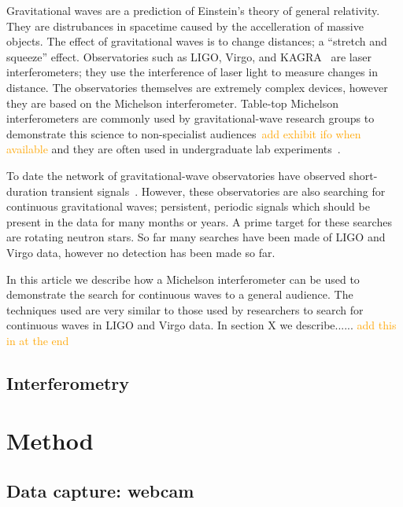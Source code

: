 \documentclass[prb,preprint]{revtex4-1}
\newcommand{\han}{\textcolor{orange}}
\begin{document}
Gravitational waves are a prediction of Einstein's theory of general relativity. 
They are distrubances in spacetime caused by the accelleration of massive objects. 
The effect of gravitational waves is to change distances; a ``stretch and squeeze'' effect. 
Observatories such as LIGO, Virgo, and KAGRA~\cite{KAGRA:2013} are laser interferometers; they use the interference of laser light to measure changes in distance. 
The observatories themselves are extremely complex devices, however they are based on the Michelson interferometer. 
Table-top Michelson interferometers are commonly used by gravitational-wave research groups to demonstrate this science to non-specialist audiences~\cite{ThorLabsIFO,NikhefIFO}\han{add exhibit ifo when available} and they are often used in undergraduate lab experiments~\cite{UgoliniEtAl:2019}. 


To date the network of gravitational-wave observatories have observed short-duration transient signals~\cite{GWTC-1:2018,GWOSC:online}. 
However, these observatories are also searching for continuous gravitational waves; persistent, periodic signals which should be present in the data for many months or years. 
A prime target for these searches are rotating neutron stars. 
So far many searches have been made of LIGO and Virgo data, however no detection has been made so far. 


In this article we describe how a Michelson interferometer can be used to demonstrate the search for continuous waves to a general audience. 
The techniques used are very similar to those used by researchers to search for continuous waves in LIGO and Virgo data. 
In section X we describe...... \han{add this in at the end}


\subsection{Interferometry}


\section{Method}

\subsection{Data capture: webcam}
\end{document}
